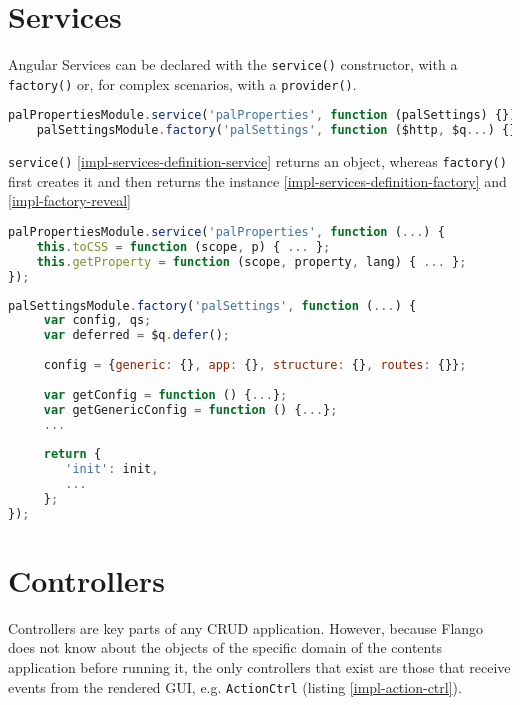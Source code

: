 \section{Services}
Angular Services can be declared with the \texttt{service()} constructor, with a \texttt{factory()} or, for complex scenarios, with a \texttt{provider()}.

\begin{lstlisting}[language=JavaScript,caption=Examples of services definition, label=impl-services-definition]
    palPropertiesModule.service('palProperties', function (palSettings) {});
    palSettingsModule.factory('palSettings', function ($http, $q...) {});
\end{lstlisting}




\texttt{service()} \ref{impl-services-definition-service} returns an object, whereas \texttt{factory()} first creates it and then returns the instance \ref{impl-services-definition-factory} and \ref{impl-factory-reveal}

\begin{lstlisting}[language=JavaScript,caption=Examples of services definition (service()), label=impl-services-definition-service]
palPropertiesModule.service('palProperties', function (...) {
    this.toCSS = function (scope, p) { ... };
    this.getProperty = function (scope, property, lang) { ... };
});
\end{lstlisting}

\begin{lstlisting}[language=JavaScript,caption=Examples of services definition (factory()), label=impl-services-definition-factory]
palSettingsModule.factory('palSettings', function (...) {
     var config, qs;
     var deferred = $q.defer();
     
     config = {generic: {}, app: {}, structure: {}, routes: {}};
     
     var getConfig = function () {...};
     var getGenericConfig = function () {...};
     ...
     
     return {
        'init': init,
        ...
     };
});
\end{lstlisting}

\section{Controllers}
\label{sec:controllers}
Controllers are key parts of any \ac{CRUD} application.
However, because Flango \cm does not know about the objects of the specific domain  of the contents application before running it, the only controllers that exist are those that receive events from the rendered \ac{GUI}, e.g. \texttt{ActionCtrl} (listing \ref{impl-action-ctrl}).
